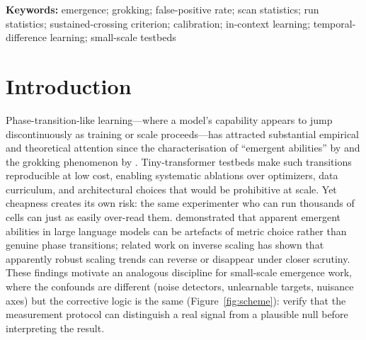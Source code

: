 \documentclass[11pt]{article}
\theoremstyle{plain}
\theoremstyle{definition}
\begin{document}
\vspace{4pt}\noindent\textbf{Keywords:} emergence; grokking; false-positive rate; scan
statistics; run statistics; sustained-crossing criterion; calibration; in-context learning;
temporal-difference learning; small-scale testbeds


\section{Introduction}\label{sec:intro}

Phase-transition-like learning---where a model's capability appears to jump
discontinuously as training or scale proceeds---has attracted substantial empirical
and theoretical attention since the characterisation of ``emergent abilities'' by
\citet{wei2022emergent} and the grokking phenomenon by \citet{power2022grokking}.
Tiny-transformer testbeds make such transitions reproducible
at low cost, enabling systematic ablations over optimizers, data curriculum, and
architectural choices that would be prohibitive at scale.
Yet cheapness creates its own risk: the same experimenter who can run thousands of
cells can just as easily over-read them.
\citet{schaeffer2023mirage} demonstrated that apparent emergent abilities in large
language models can be artefacts of metric choice rather than genuine phase transitions;
related work on inverse scaling \citep{mckenzie2023inversescaling} has shown that
apparently robust scaling trends can reverse or disappear under closer scrutiny.
These findings motivate an analogous discipline for small-scale emergence work,
where the confounds are different (noise detectors, unlearnable targets, nuisance axes)
but the corrective logic is the same (Figure~\ref{fig:scheme}): verify that the measurement protocol can
distinguish a real signal from a plausible null before interpreting the result.
\end{document}
